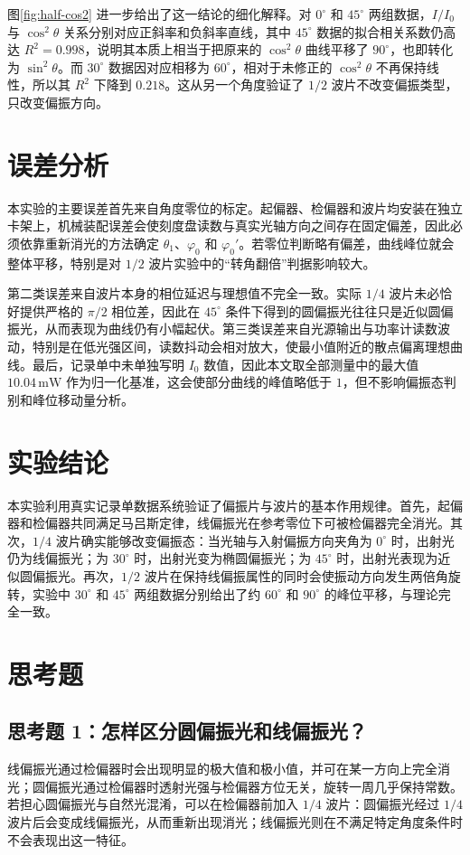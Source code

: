 \documentclass[12pt,a4paper]{article}
\begin{document}
图\ref{fig:half-cos2} 进一步给出了这一结论的细化解释。对 $0^{\circ}$ 和 $45^{\circ}$ 两组数据，$I/I_0$ 与 $\cos^2\theta$ 关系分别对应正斜率和负斜率直线，其中 $45^{\circ}$ 数据的拟合相关系数仍高达 $R^2=0.998$，说明其本质上相当于把原来的 $\cos^2\theta$ 曲线平移了 $90^{\circ}$，也即转化为 $\sin^2\theta$。而 $30^{\circ}$ 数据因对应相移为 $60^{\circ}$，相对于未修正的 $\cos^2\theta$ 不再保持线性，所以其 $R^2$ 下降到 $0.218$。这从另一个角度验证了 $1/2$ 波片不改变偏振类型，只改变偏振方向。

\section{误差分析}
本实验的主要误差首先来自角度零位的标定。起偏器、检偏器和波片均安装在独立卡架上，机械装配误差会使刻度盘读数与真实光轴方向之间存在固定偏差，因此必须依靠重新消光的方法确定 $\theta_1$、$\varphi_0$ 和 $\varphi_0'$。若零位判断略有偏差，曲线峰位就会整体平移，特别是对 $1/2$ 波片实验中的“转角翻倍”判据影响较大。

第二类误差来自波片本身的相位延迟与理想值不完全一致。实际 $1/4$ 波片未必恰好提供严格的 $\pi/2$ 相位差，因此在 $45^{\circ}$ 条件下得到的圆偏振光往往只是近似圆偏振光，从而表现为曲线仍有小幅起伏。第三类误差来自光源输出与功率计读数波动，特别是在低光强区间，读数抖动会相对放大，使最小值附近的散点偏离理想曲线。最后，记录单中未单独写明 $I_0$ 数值，因此本文取全部测量中的最大值 $10.04\,\mathrm{mW}$ 作为归一化基准，这会使部分曲线的峰值略低于 $1$，但不影响偏振态判别和峰位移动量分析。

\section{实验结论}
本实验利用真实记录单数据系统验证了偏振片与波片的基本作用规律。首先，起偏器和检偏器共同满足马吕斯定律，线偏振光在参考零位下可被检偏器完全消光。其次，$1/4$ 波片确实能够改变偏振态：当光轴与入射偏振方向夹角为 $0^{\circ}$ 时，出射光仍为线偏振光；为 $30^{\circ}$ 时，出射光变为椭圆偏振光；为 $45^{\circ}$ 时，出射光表现为近似圆偏振光。再次，$1/2$ 波片在保持线偏振属性的同时会使振动方向发生两倍角旋转，实验中 $30^{\circ}$ 和 $45^{\circ}$ 两组数据分别给出了约 $60^{\circ}$ 和 $90^{\circ}$ 的峰位平移，与理论完全一致。

\section{思考题}
\subsection*{思考题 1：怎样区分圆偏振光和线偏振光？}
线偏振光通过检偏器时会出现明显的极大值和极小值，并可在某一方向上完全消光；圆偏振光通过检偏器时透射光强与检偏器方位无关，旋转一周几乎保持常数。若担心圆偏振光与自然光混淆，可以在检偏器前加入 $1/4$ 波片：圆偏振光经过 $1/4$ 波片后会变成线偏振光，从而重新出现消光；线偏振光则在不满足特定角度条件时不会表现出这一特征。
\end{document}
